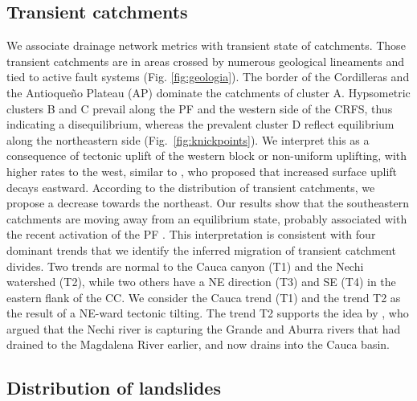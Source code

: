 \documentclass[draft]{agujournal2019}
\begin{document}
\subsection{Transient catchments}
\par We associate drainage network metrics with transient state of catchments. Those transient catchments are in areas crossed by numerous geological lineaments and tied to active fault systems (Fig. \ref{fig:geologia}). The border of the Cordilleras and the Antioqueño Plateau (AP) dominate the catchments of cluster A. Hypsometric clusters B and C prevail along the PF and the western side of the CRFS, thus indicating a disequilibrium, whereas the prevalent cluster D reflect equilibrium along the northeastern side (Fig.~\ref{fig:knickpoints}). We interpret this as a consequence of tectonic uplift of the western block or non-uniform uplifting, with higher rates to the west, similar to , who proposed that increased surface uplift decays eastward. According to the distribution of transient catchments, we propose a decrease towards the northeast. Our results show that the southeastern catchments are moving away from an equilibrium state, probably associated with the recent activation of the PF \cite{acosta2007, feininger1970}. This interpretation is consistent with four dominant trends that we identify the inferred migration of transient catchment divides. Two trends are normal to the Cauca canyon (T1) and the Nechi watershed (T2), while two others have a NE direction (T3) and SE (T4) in the eastern flank of the CC. We consider the Cauca trend (T1)  and the trend T2 as the result of a NE-ward tectonic tilting. The trend T2 supports the idea by , who argued that the Nechi river is capturing the Grande and Aburra rivers that had drained to the Magdalena River earlier, and now drains into the Cauca basin. 

\subsection{Distribution of landslides}
\end{document}
